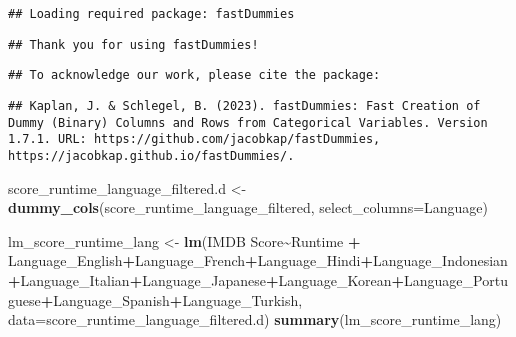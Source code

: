 \documentclass[
]{article}
\newenvironment{Shaded}{\begin{snugshade}}{\end{snugshade}}
\newcommand{\AttributeTok}[1]{\textcolor[rgb]{0.13,0.29,0.53}{#1}}
\newcommand{\FunctionTok}[1]{\textcolor[rgb]{0.13,0.29,0.53}{\textbf{#1}}}
\newcommand{\NormalTok}[1]{#1}
\newcommand{\OtherTok}[1]{\textcolor[rgb]{0.56,0.35,0.01}{#1}}
\newcommand{\SpecialCharTok}[1]{\textcolor[rgb]{0.81,0.36,0.00}{\textbf{#1}}}
\newcommand{\StringTok}[1]{\textcolor[rgb]{0.31,0.60,0.02}{#1}}
\begin{document}
\begin{verbatim}
## Loading required package: fastDummies
\end{verbatim}

\begin{verbatim}
## Thank you for using fastDummies!
\end{verbatim}

\begin{verbatim}
## To acknowledge our work, please cite the package:
\end{verbatim}

\begin{verbatim}
## Kaplan, J. & Schlegel, B. (2023). fastDummies: Fast Creation of Dummy (Binary) Columns and Rows from Categorical Variables. Version 1.7.1. URL: https://github.com/jacobkap/fastDummies, https://jacobkap.github.io/fastDummies/.
\end{verbatim}

\begin{Shaded}
\begin{Highlighting}[]
\NormalTok{score\_runtime\_language\_filtered.d }\OtherTok{\textless{}{-}} \FunctionTok{dummy\_cols}\NormalTok{(score\_runtime\_language\_filtered, }\AttributeTok{select\_columns=}\StringTok{\textquotesingle{}Language\textquotesingle{}}\NormalTok{)}


\NormalTok{lm\_score\_runtime\_lang }\OtherTok{\textless{}{-}} \FunctionTok{lm}\NormalTok{(}\StringTok{\textasciigrave{}}\AttributeTok{IMDB Score}\StringTok{\textasciigrave{}}\SpecialCharTok{\textasciitilde{}}\NormalTok{Runtime }\SpecialCharTok{+}\NormalTok{ Language\_English}\SpecialCharTok{+}\NormalTok{Language\_French}\SpecialCharTok{+}\NormalTok{Language\_Hindi}\SpecialCharTok{+}\NormalTok{Language\_Indonesian}\SpecialCharTok{+}\NormalTok{Language\_Italian}\SpecialCharTok{+}\NormalTok{Language\_Japanese}\SpecialCharTok{+}\NormalTok{Language\_Korean}\SpecialCharTok{+}\NormalTok{Language\_Portuguese}\SpecialCharTok{+}\NormalTok{Language\_Spanish}\SpecialCharTok{+}\NormalTok{Language\_Turkish, }\AttributeTok{data=}\NormalTok{score\_runtime\_language\_filtered.d)}
\FunctionTok{summary}\NormalTok{(lm\_score\_runtime\_lang)}
\end{Highlighting}
\end{Shaded}
\end{document}
